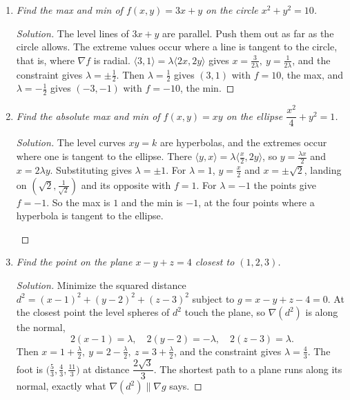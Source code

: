 \documentclass[12pt]{article}
\newenvironment{solution}
  {\renewcommand\qedsymbol{$\blacksquare$}\begin{proof}[Solution]}
  {\end{proof}}
\begin{document}
\begin{enumerate}
\begin{enumerate}
    \item \textit{Find the max and min of $f(x,y)=3x+y$ on the circle $x^2+y^2=10$.}

    \begin{solution}
    The level lines of $3x+y$ are parallel. Push them out as far as the circle allows. The extreme values occur where a line is tangent to the circle, that is, where $\nabla f$ is radial. $\langle3,1\rangle=\lambda\langle2x,2y\rangle$ gives $x=\tfrac{3}{2\lambda},\ y=\tfrac{1}{2\lambda}$, and the constraint gives $\lambda=\pm\tfrac12$. Then $\lambda=\tfrac12$ gives $(3,1)$ with $f=10$, the max, and $\lambda=-\tfrac12$ gives $(-3,-1)$ with $f=-10$, the min.
    \end{solution}

    \item \textit{Find the absolute max and min of $f(x,y)=xy$ on the ellipse $\dfrac{x^2}{4}+y^2=1$.}

    \begin{solution}
    The level curves $xy=k$ are hyperbolas, and the extremes occur where one is tangent to the ellipse. There $\langle y,x\rangle=\lambda\langle\tfrac{x}{2},2y\rangle$, so $y=\tfrac{\lambda x}{2}$ and $x=2\lambda y$. Substituting gives $\lambda=\pm1$. For $\lambda=1$, $y=\tfrac{x}{2}$ and $x=\pm\sqrt2$, landing on $(\sqrt2,\tfrac{1}{\sqrt2})$ and its opposite with $f=1$. For $\lambda=-1$ the points give $f=-1$. So the max is $1$ and the min is $-1$, at the four points where a hyperbola is tangent to the ellipse.

    \begin{center}
    \end{center}
    \end{solution}

    \item \textit{Find the point on the plane $x-y+z=4$ closest to $(1,2,3)$.}

    \begin{solution}
    Minimize the squared distance $d^2=(x-1)^2+(y-2)^2+(z-3)^2$ subject to $g=x-y+z-4=0$. At the closest point the level spheres of $d^2$ touch the plane, so $\nabla(d^2)$ is along the normal,
    \[
      2(x-1)=\lambda,\quad 2(y-2)=-\lambda,\quad 2(z-3)=\lambda.
    \]
    Then $x=1+\tfrac\lambda2,\ y=2-\tfrac\lambda2,\ z=3+\tfrac\lambda2$, and the constraint gives $\lambda=\tfrac43$. The foot is $\bigl(\tfrac53,\tfrac43,\tfrac{11}{3}\bigr)$ at distance $\dfrac{2\sqrt3}{3}$. The shortest path to a plane runs along its normal, exactly what $\nabla(d^2)\parallel\nabla g$ says.
    \end{solution}


\end{enumerate}
\end{enumerate}
\end{document}

